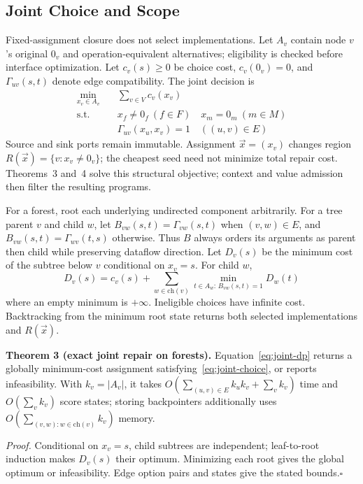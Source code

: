 \subsection{Joint Choice and Scope}
Fixed-assignment closure does not select implementations. Let $A_v$ contain
node $v$'s original $0_v$ and operation-equivalent alternatives; eligibility
is checked before interface optimization. Let $c_v(s)\geq0$ be choice cost,
$c_v(0_v)=0$, and $\Gamma_{uv}(s,t)$ denote edge compatibility.
The joint decision is
\begin{equation}
\begin{split}
\min_{x_v\in A_v}\quad &\sum_{v\in V}c_v(x_v)\\
\text{s.t.}\quad &x_f\ne0_f\ (f\in F)\quad x_m=0_m\ (m\in M)\\
&\Gamma_{uv}(x_u,x_v)=1\quad((u,v)\in E)
\end{split}\label{eq:joint-choice}
\end{equation}
Source and sink ports remain immutable. Assignment $\vec{x}=(x_v)$ changes
region $R(\vec{x})=\{v:x_v\ne0_v\}$; the cheapest seed need not minimize
total repair cost. Theorems~3 and~4 solve this structural objective; context
and value admission then filter the resulting programs.

For a forest, root each underlying undirected component arbitrarily. For a
tree parent $v$ and child $w$, let $B_{vw}(s,t)=\Gamma_{vw}(s,t)$ when
$(v,w)\in E$, and $B_{vw}(s,t)=\Gamma_{wv}(t,s)$ otherwise. Thus $B$ always
orders its arguments as parent then child while preserving dataflow direction.
Let $D_v(s)$ be the minimum cost of the subtree below $v$ conditional on
$x_v=s$. For child $w$,
\begin{equation}
D_v(s)=c_v(s)+\sum_{w\in\mathrm{ch}(v)}
\min_{t\in A_w:\,B_{vw}(s,t)=1}D_w(t)
\label{eq:joint-dp}
\end{equation}
where an empty minimum is $+\infty$. Ineligible choices have infinite cost. Backtracking
from the minimum root state returns both selected implementations and
$R(\vec{x})$.

\textbf{Theorem 3 (exact joint repair on forests).}
Equation~\eqref{eq:joint-dp} returns a globally minimum-cost assignment
satisfying~\eqref{eq:joint-choice}, or reports infeasibility. With $k_v=|A_v|$,
it takes $O(\sum_{(u,v)\in E}k_uk_v+\sum_v k_v)$ time and
$O(\sum_v k_v)$ score states; storing backpointers additionally uses
$O(\sum_{(v,w):w\in\mathrm{ch}(v)}k_v)$ memory.

\emph{Proof.} Conditional on $x_v=s$, child subtrees are independent;
leaf-to-root induction makes $D_v(s)$ their optimum. Minimizing each root
gives the global optimum or infeasibility. Edge option pairs and states give
the stated bounds.\hfill$\square$

